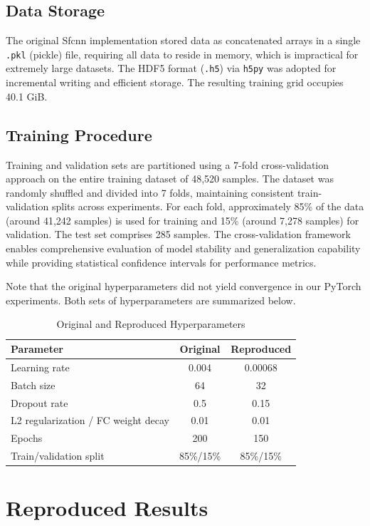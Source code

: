 \documentclass[unnumsec,webpdf,contemporary,large]{oup-authoring-template}
\theoremstyle{thmstyleone}%
\theoremstyle{thmstyletwo}%
\theoremstyle{thmstylethree}%
\begin{document}
\subsection{Data Storage}
The original Sfcnn implementation stored data as concatenated arrays in a single \texttt{.pkl} (pickle) file, requiring all data to reside in memory, which is impractical for extremely large datasets. The HDF5 format (\texttt{.h5}) via \texttt{h5py} was adopted for incremental writing and efficient storage. The resulting training grid occupies 40.1 GiB.

\subsection{Training Procedure}
Training and validation sets are partitioned using a 7-fold cross-validation 
approach on the entire training dataset of 48,520 samples. The dataset was randomly 
shuffled and divided into 7 folds, 
maintaining consistent train-validation splits across experiments. For each fold, 
approximately 85\% of the data (around 41,242 samples) is used for 
training and 15\% (around 7,278 samples) for validation. 
The test set comprises 285 samples. 
The cross-validation framework enables comprehensive evaluation 
of model stability and generalization capability while providing 
statistical confidence intervals for performance metrics.

Note that the original hyperparameters did not yield convergence 
in our PyTorch experiments. Both sets of hyperparameters are summarized below.

\begin{table}[H]
\centering
\caption{Original and Reproduced Hyperparameters}
\label{tab:hyperparams}
\begin{tabular}{lcc}
\toprule
Parameter & Original & Reproduced \\
\midrule
Learning rate & 0.004 & 0.00068 \\
Batch size & 64 & 32 \\
Dropout rate & 0.5 & 0.15 \\
L2 regularization / FC weight decay & 0.01 & 0.01 \\
Epochs & 200 & 150 \\
Train/validation split & 85\%/15\% & 85\%/15\% \\
\bottomrule
\end{tabular}
\end{table}

\section{Reproduced Results}
\label{sec:ReproducedResults}
\end{document}
